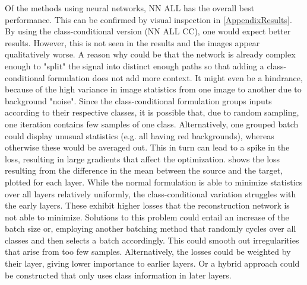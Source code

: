 Of the methods using neural networks, NN ALL has the overall best performance.
This can be confirmed by visual inspection in \cref{AppendixResults}.
By using the class-conditional version (NN ALL CC), one would expect better results.
However, this is not seen in the results and the images appear qualitatively worse. 
A reason why could be that the network is already complex enough to "split" the signal into distinct enough paths so that adding
a class-conditional formulation does not add more context.
It might even be a hindrance, because of the high variance in image statistics
from one image to another due to background "noise".
Since the class-conditional formulation groups inputs according to their respective classes, 
it is possible that, due to random sampling, one iteration contains 
few samples of one class. Alternatively, one grouped batch could
display unusual statistics (e.g. all having red backgrounds), whereas otherwise these would be averaged out.
This in turn can lead to a spike in the loss, resulting in large gradients that affect the optimization.
 shows the loss resulting from the difference in the mean
between the source and the target, plotted for each layer.
While the normal formulation is able to minimize statistics over all layers relatively uniformly,
the class-conditional variation struggles with the early layers.
These exhibit higher losses that the reconstruction network is not able to minimize.
Solutions to this problem could entail an increase of the batch size
or, employing another batching method that randomly cycles over all classes
and then selects a batch accordingly. 
This could smooth out irregularities that arise from too few samples.
Alternatively, the losses could be weighted by their layer, giving lower importance to earlier layers. 
Or a hybrid approach could be constructed that only uses class information in later layers.

